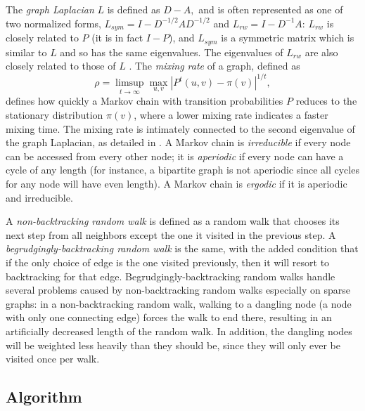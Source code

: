 \documentclass{article} %
\begin{document}
The \emph{graph Laplacian} $L$ is defined as $D - A,$ and is often represented as one of two normalized forms, $L_{sym} = I - D^{-1/2}AD^{-1/2}$ and $L_{rw} = I - D^{-1}A$: $L_{rw}$ is closely related to $P$ (it is in fact $I-P$), and $L_{sym}$ is a symmetric matrix which is similar to $L$ and so has the same eigenvalues. The eigenvalues of $L_{rw}$ are also closely related to those of $L$ \cite{Luxburg}. The \emph{mixing rate} of a graph, defined as 
$$\rho = \limsup_{t\rightarrow\infty}\max_{u,v}\left|P^{t}(u,v)-\pi(v)\right|^{1/t},$$ 
defines how quickly a Markov chain with transition probabilities $P$ reduces to the stationary distribution $\pi(v)$, where a lower mixing rate indicates a faster mixing time. The mixing rate is intimately connected to the second eigenvalue of the graph Laplacian, as detailed in \cite{Lovasz}. A Markov chain is \emph{irreducible} if every node can be accessed from every other node; it is \emph{aperiodic} if every node can have a cycle of any length (for instance, a bipartite graph is not aperiodic since all cycles for any node will have even length). A Markov chain is \emph{ergodic} if it is aperiodic and irreducible. 

A \emph{non-backtracking random walk} is defined as a random walk that chooses its next step from all neighbors except the one it visited in the previous step. A \emph{begrudgingly-backtracking random walk} is the same, with the added condition that if the only choice of edge is the one visited previously, then it will resort to backtracking for that edge. Begrudgingly-backtracking random walks handle several problems caused by non-backtracking random walks especially on sparse graphs: in a non-backtracking random walk, walking to a dangling node (a node with only one connecting edge) forces the walk to end there, resulting in an artificially decreased length of the random walk. In addition, the dangling nodes will be weighted less heavily than they should be, since they will only ever be visited once per walk.

\subsection{Algorithm}
\end{document}
